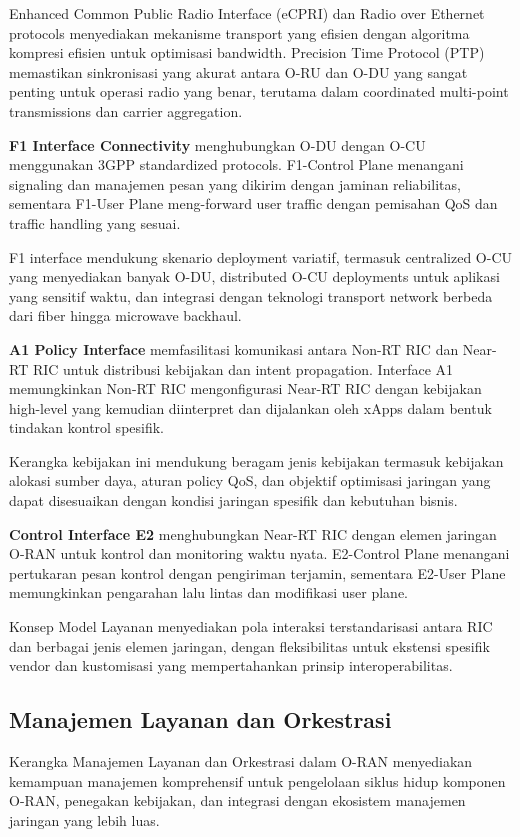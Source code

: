 Enhanced Common Public Radio Interface (eCPRI) dan Radio over Ethernet protocols menyediakan mekanisme transport yang efisien dengan algoritma kompresi efisien untuk optimisasi bandwidth. Precision Time Protocol (PTP) memastikan sinkronisasi yang akurat antara O-RU dan O-DU yang sangat penting untuk operasi radio yang benar, terutama dalam coordinated multi-point transmissions dan carrier aggregation.

\textbf{F1 Interface Connectivity} menghubungkan O-DU dengan O-CU menggunakan 3GPP standardized protocols. F1-Control Plane menangani signaling dan manajemen pesan yang dikirim dengan jaminan reliabilitas, sementara F1-User Plane meng-forward user traffic dengan pemisahan QoS dan traffic handling yang sesuai.

F1 interface mendukung skenario deployment variatif, termasuk centralized O-CU yang menyediakan banyak O-DU, distributed O-CU deployments untuk aplikasi yang sensitif waktu, dan integrasi dengan teknologi transport network berbeda dari fiber hingga microwave backhaul.

\textbf{A1 Policy Interface} memfasilitasi komunikasi antara Non-RT RIC dan Near-RT RIC untuk distribusi kebijakan dan intent propagation. Interface A1 memungkinkan Non-RT RIC mengonfigurasi Near-RT RIC dengan kebijakan high-level yang kemudian diinterpret dan dijalankan oleh xApps dalam bentuk tindakan kontrol spesifik.

Kerangka kebijakan ini mendukung beragam jenis kebijakan termasuk kebijakan alokasi sumber daya, aturan policy QoS, dan objektif optimisasi jaringan yang dapat disesuaikan dengan kondisi jaringan spesifik dan kebutuhan bisnis.

\textbf{Control Interface E2} menghubungkan Near-RT RIC dengan elemen jaringan O-RAN untuk kontrol dan monitoring waktu nyata. E2-Control Plane menangani pertukaran pesan kontrol dengan pengiriman terjamin, sementara E2-User Plane memungkinkan pengarahan lalu lintas dan modifikasi user plane.

Konsep Model Layanan menyediakan pola interaksi terstandarisasi antara RIC dan berbagai jenis elemen jaringan, dengan fleksibilitas untuk ekstensi spesifik vendor dan kustomisasi yang mempertahankan prinsip interoperabilitas.

\subsection{Manajemen Layanan dan Orkestrasi}

Kerangka Manajemen Layanan dan Orkestrasi dalam O-RAN menyediakan kemampuan manajemen komprehensif untuk pengelolaan siklus hidup komponen O-RAN, penegakan kebijakan, dan integrasi dengan ekosistem manajemen jaringan yang lebih luas.

